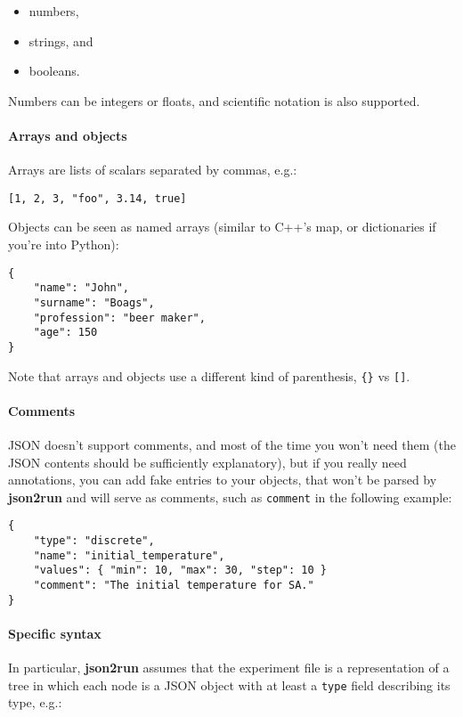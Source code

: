 \documentclass[11pt,notitlepage,twoside,a4paper]{article}
\begin{document}
\begin{itemize}
\item
  numbers,
\item
  strings, and
\item
  booleans.
\end{itemize}
Numbers can be integers or floats, and scientific notation is also
supported.

\paragraph{Arrays and objects}
Arrays are lists of scalars separated by commas, e.g.:

\begin{lstlisting} 
[1, 2, 3, "foo", 3.14, true]
\end{lstlisting}

\noindent
Objects can be seen as named arrays (similar to C++'s map, or
dictionaries if you're into Python):

\begin{lstlisting} 
{  
    "name": "John",
    "surname": "Boags",
    "profession": "beer maker",
    "age": 150
}
\end{lstlisting}

\noindent
Note that arrays and objects use a different kind of parenthesis,
\texttt{\{\}} vs \texttt{{[}{]}}.

\paragraph{Comments}

JSON doesn't support comments, and most of the time you won't need them
(the JSON contents should be sufficiently explanatory), but if you
really need annotations, you can add fake entries to your objects, that
won't be parsed by \textbf{json2run} and will serve as comments, such as
\texttt{comment} in the following example:

\begin{small}
\begin{lstlisting} 
{ 
    "type": "discrete", 
    "name": "initial_temperature", 
    "values": { "min": 10, "max": 30, "step": 10 }
    "comment": "The initial temperature for SA."
}
\end{lstlisting}
\end{small}

\noindent
\paragraph{Specific syntax}
In particular, \textbf{json2run} assumes that the experiment file is a
representation of a tree in which each node is a JSON object with at
least a \texttt{type} field describing its type, e.g.:
\end{document}
